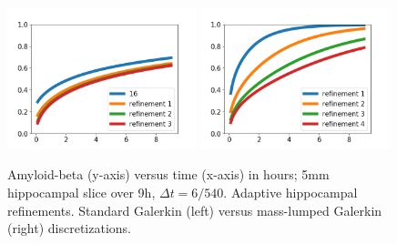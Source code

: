 \begin{figure}	
\includegraphics[width=0.49\textwidth]{./chapters/chp6/FIG/tracer_hippocampus_notlumped_addaptive.png}
\includegraphics[width=0.49\textwidth]{./chapters/chp6/FIG/tracer_hippocampus_lumped_addaptive.png}
\caption{
Amyloid-beta (y-axis) versus time (x-axis) in hours; 5mm hippocampal slice over 
9h, $\Delta t = 6/540$. Adaptive hippocampal refinements.  Standard Galerkin (left) 
versus mass-lumped Galerkin (right) discretizations.
}
\label{fig:chp6:numerics3}
\end{figure}

